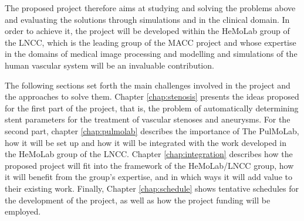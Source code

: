 The proposed project therefore aims at studying and solving the problems above and evaluating the solutions through simulations and in the clinical domain. In order to achieve it, the project will be developed within the HeMoLab group of the LNCC, which is the leading group of the MACC project and whose expertise in the domains of medical image processing and modelling and simulations of the human vascular system will be an invaluable contribution.

The following sections set forth the main challenges involved in the project and the approaches to solve them. Chapter \ref{chap:stenosis} presents the ideas proposed for the first part of the project, that is, the problem of automatically determining stent parameters for the treatment of vascular stenoses and aneurysms. For the second part, chapter \ref{chap:pulmolab} describes the importance of The PulMoLab, how it will be set up and how it will be integrated with the work developed in the HeMoLab group of the LNCC. Chapter \ref{chap:integration} describes how the proposed project will fit into the framework of the HeMoLab/LNCC group, how it will benefit from the group's expertise, and in which ways it will add value to their existing work. Finally, Chapter \ref{chap:schedule} shows tentative schedules for the development of the project, as well as how the project funding will be employed.



